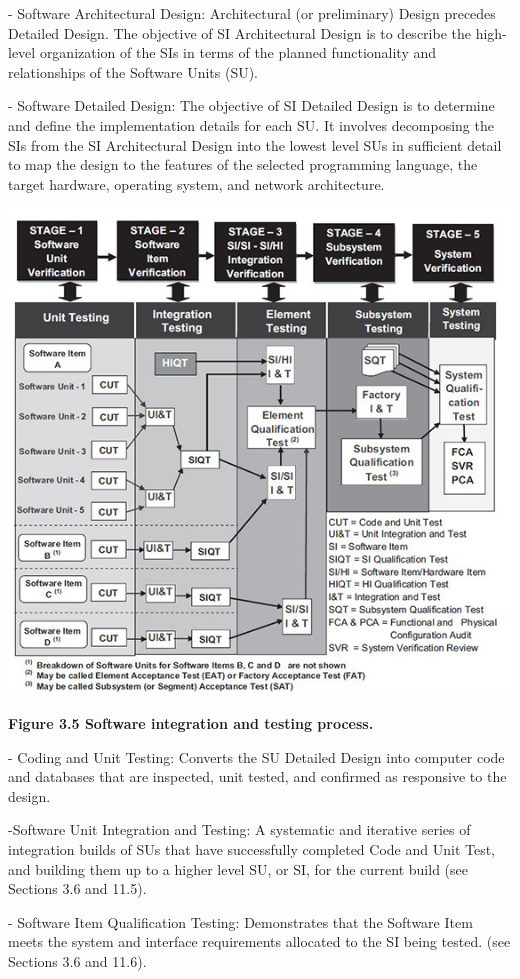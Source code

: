 \documentclass{book}
\begin{document}
- Software Architectural Design: Architectural (or preliminary) Design precedes Detailed Design. The objective of SI Architectural Design is to describe the high-level organization of the SIs in terms of the planned functionality and relationships of the Software Units (SU).

- Software Detailed Design: The objective of SI Detailed Design is to determine and define the implementation details for each SU. It involves decomposing the SIs from the SI Architectural Design into the lowest level SUs in sufficient detail to map the design to the features of the selected programming language, the target hardware, operating system, and network architecture.


\includegraphics{3.jpg}

\textbf{Figure 3.5 Software integration and testing process.}

- Coding and Unit Testing: Converts the SU Detailed Design into computer code and databases that are inspected, unit tested, and confirmed as responsive to the design.

-Software Unit Integration and Testing: A systematic and iterative series of integration builds of SUs that have successfully completed Code and Unit Test, and building them up to a higher level SU, or SI, for the current build (see Sections 3.6 and 11.5).

- Software Item Qualification Testing: Demonstrates that the Software Item meets the system and interface requirements allocated to the SI being tested. (see Sections 3.6 and 11.6).
\end{document}
